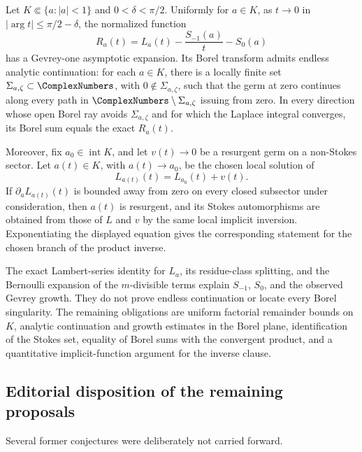 \begin{conjecture}
\label{conj:cyclotomic-resurgent-inverse}
Let \(K\Subset\{a:\lvert a\rvert<1\}\) and
\(0<\delta<\pi/2\).  Uniformly for \(a\in K\), as \(t\to0\) in
\(\lvert\arg t\rvert\le\pi/2-\delta\), the normalized function
\[
 R_a(t)=L_a(t)-\frac{S_{-1}(a)}{t}-S_0(a)
\]
has a Gevrey-one asymptotic expansion.  Its Borel transform admits endless
analytic continuation: for each \(a\in K\), there is a locally finite set
\(\Sigma_{a,\zeta}\subset\ComplexNumbers\), with \(0\notin\Sigma_{a,\zeta}\), such that the
germ at zero continues along every path in
\(\ComplexNumbers\setminus\Sigma_{a,\zeta}\) issuing from zero.  In every direction whose
open Borel ray avoids \(\Sigma_{a,\zeta}\) and for which the Laplace integral
converges, its Borel sum equals the exact \(R_a(t)\).

Moreover, fix \(a_0\in\operatorname{int}K\), and let \(v(t)\to0\) be a
resurgent germ on a non-Stokes sector.  Let \(a(t)\in K\), with
\(a(t)\to a_0\), be the chosen local solution of
\[
 L_{a(t)}(t)=L_{a_0}(t)+v(t).
\]
If \(\partial_aL_{a(t)}(t)\) is bounded away from zero on every closed
subsector under consideration, then \(a(t)\) is resurgent, and its Stokes
automorphisms are obtained from those of \(L\) and \(v\) by the same local
implicit inversion.  Exponentiating the displayed equation gives the
corresponding statement for the chosen branch of the product inverse.
\end{conjecture}

The exact Lambert-series identity for \(L_a\), its residue-class splitting,
and the Bernoulli expansion of the \(m\)-divisible terms explain
\(S_{-1}\), \(S_0\), and the observed Gevrey growth.  They do not prove
endless continuation or locate every Borel singularity.  The remaining
obligations are uniform factorial remainder bounds on \(K\), analytic
continuation and growth estimates in the Borel plane, identification of the
Stokes set, equality of Borel sums with the convergent product, and a
quantitative implicit-function argument for the inverse clause.

\subsection{Editorial disposition of the remaining proposals}

Several former conjectures were deliberately not carried forward.

